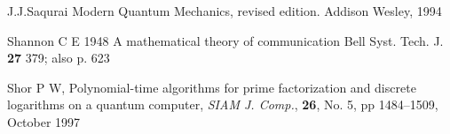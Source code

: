\documentclass{article}
\begin{document}
\begin{thebibliography}{12}
J.J.Saqurai 
Modern Quantum Mechanics, revised edition.
Addison Wesley, 1994






% 
% 
% 
% 

Shannon C E 1948 
A mathematical theory of communication
Bell Syst. Tech. J. {\bf 27} 379; also p. 623



Shor P W,
\newblock Polynomial-time algorithms for prime factorization and
discrete logarithms on a quantum computer,
 {\em SIAM J. Comp.}, {\bf 26}, No. 5, pp 1484--1509, 
October 1997




% 
% 
% 
% 
% 
% 
% 
% 
% 
% 
% 
% 
% 
% 


\end{thebibliography}
\end{document}
